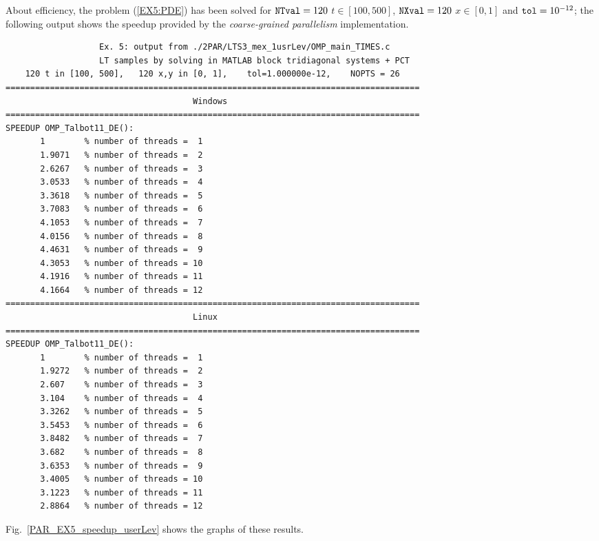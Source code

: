 \documentclass[a4paper,10pt]{report}%
\begin{document}
About efficiency, the problem (\ref{EX5:PDE}) has been solved for ${\tt NTval}=120$ $t\in[100, 500]$,
${\tt NXval}=120$ $x\in[0,1]$ and ${\tt tol}=10^{-12}$; the following output shows the speedup provided by the {\em coarse-grained parallelism} implementation.
\begin{lstlisting}
                   Ex. 5: output from ./2PAR/LTS3_mex_1usrLev/OMP_main_TIMES.c
                   LT samples by solving in MATLAB block tridiagonal systems + PCT
    120 t in [100, 500],   120 x,y in [0, 1],    tol=1.000000e-12,    NOPTS = 26
====================================================================================
                                      Windows
====================================================================================
SPEEDUP OMP_Talbot11_DE():
       1        % number of threads =  1
       1.9071   % number of threads =  2
       2.6267   % number of threads =  3
       3.0533   % number of threads =  4
       3.3618   % number of threads =  5
       3.7083   % number of threads =  6
       4.1053   % number of threads =  7
       4.0156   % number of threads =  8
       4.4631   % number of threads =  9
       4.3053   % number of threads = 10
       4.1916   % number of threads = 11
       4.1664   % number of threads = 12
====================================================================================
                                      Linux
====================================================================================
SPEEDUP OMP_Talbot11_DE():
       1        % number of threads =  1
       1.9272   % number of threads =  2
       2.607    % number of threads =  3
       3.104    % number of threads =  4
       3.3262   % number of threads =  5
       3.5453   % number of threads =  6
       3.8482   % number of threads =  7
       3.682    % number of threads =  8
       3.6353   % number of threads =  9
       3.4005   % number of threads = 10
       3.1223   % number of threads = 11
       2.8864   % number of threads = 12
\end{lstlisting}
Fig.~\ref{PAR_EX5_speedup_userLev} shows the graphs of these results.
\end{document}
